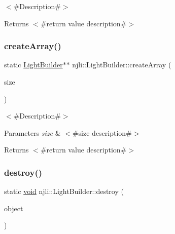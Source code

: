 $<$\#\+Description\#$>$

\begin{DoxyReturn}{Returns}
$<$\#return value description\#$>$ 
\end{DoxyReturn}
\mbox{\label{classnjli_1_1_light_builder_aab30733f1421b35630caaa0ac907dcb2}} 
\subsubsection{\texorpdfstring{create\+Array()}{createArray()}}
{\footnotesize\ttfamily static \mbox{\hyperlink{classnjli_1_1_light_builder}{Light\+Builder}}$\ast$$\ast$ njli\+::\+Light\+Builder\+::create\+Array (\begin{DoxyParamCaption}\item[{const \mbox{\hyperlink{_util_8h_a10e94b422ef0c20dcdec20d31a1f5049}{u32}}}]{size }\end{DoxyParamCaption})\hspace{0.3cm}{\ttfamily [static]}}

$<$\#\+Description\#$>$


\begin{DoxyParams}{Parameters}
{\em size} & $<$\#size description\#$>$\\
\hline
\end{DoxyParams}
\begin{DoxyReturn}{Returns}
$<$\#return value description\#$>$ 
\end{DoxyReturn}
\mbox{\label{classnjli_1_1_light_builder_abf4ee2d41383010dcbad031b939e66ac}} 
\subsubsection{\texorpdfstring{destroy()}{destroy()}}
{\footnotesize\ttfamily static \mbox{\hyperlink{_thread_8h_af1e856da2e658414cb2456cb6f7ebc66}{void}} njli\+::\+Light\+Builder\+::destroy (\begin{DoxyParamCaption}\item[{\mbox{\hyperlink{classnjli_1_1_light_builder}{Light\+Builder}} $\ast$}]{object }\end{DoxyParamCaption})\hspace{0.3cm}{\ttfamily [static]}}

